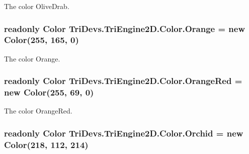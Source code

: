 The color Olive\-Drab. 

\hypertarget{struct_tri_devs_1_1_tri_engine2_d_1_1_color_aeca74430b3f58767f0a7e913b28490f7}{
\subsubsection[{Orange}]{\setlength{\rightskip}{0pt plus 5cm}readonly {\bf Color} Tri\-Devs.\-Tri\-Engine2\-D.\-Color.\-Orange = new {\bf Color}(255, 165, 0)\hspace{0.3cm}{\ttfamily [static]}}}\label{struct_tri_devs_1_1_tri_engine2_d_1_1_color_aeca74430b3f58767f0a7e913b28490f7}


The color Orange. 

\hypertarget{struct_tri_devs_1_1_tri_engine2_d_1_1_color_a2c6f856bd67091bd076e6689a7b32abe}{
\subsubsection[{Orange\-Red}]{\setlength{\rightskip}{0pt plus 5cm}readonly {\bf Color} Tri\-Devs.\-Tri\-Engine2\-D.\-Color.\-Orange\-Red = new {\bf Color}(255, 69, 0)\hspace{0.3cm}{\ttfamily [static]}}}\label{struct_tri_devs_1_1_tri_engine2_d_1_1_color_a2c6f856bd67091bd076e6689a7b32abe}


The color Orange\-Red. 

\hypertarget{struct_tri_devs_1_1_tri_engine2_d_1_1_color_a166720b2a3d055d6164d7729431297aa}{
\subsubsection[{Orchid}]{\setlength{\rightskip}{0pt plus 5cm}readonly {\bf Color} Tri\-Devs.\-Tri\-Engine2\-D.\-Color.\-Orchid = new {\bf Color}(218, 112, 214)\hspace{0.3cm}{\ttfamily [static]}}}\label{struct_tri_devs_1_1_tri_engine2_d_1_1_color_a166720b2a3d055d6164d7729431297aa}


